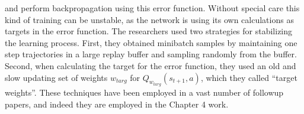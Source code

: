 and perform backpropagation using this error function. Without special care this kind of training can be unstable, as the network is using its own calculations as targets in the error function. The researchers used two strategies for stabilizing the learning process. First, they obtained minibatch samples by maintaining one step trajectories in a large replay buffer and sampling randomly from the buffer. Second, when calculating the target for the error function, they used an old and slow updating set of weights $w_{targ}$ for $Q_{w_{targ}}(s_{t+1}, a)$, which they called ``target weights''. These techniques have been employed in a vast number of followup papers, and indeed they are employed in the Chapter 4 work.
